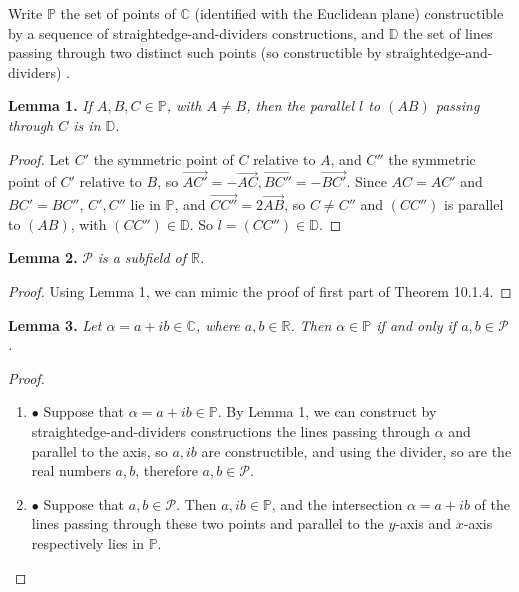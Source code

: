 \documentclass[11pt,a4paper]{article}
\newcommand{\be} {\begin{enumerate}}
\newcommand{\ee} {\end{enumerate}}
\newcommand{\R}{\mathbb{R}}
\newcommand{\C}{\mathbb{C}}
\begin{document}
Write $\mathbb{P}$ the set of points of $\C$ (identified with the Euclidean plane) constructible by a sequence of straightedge-and-dividers constructions, and $\mathbb{D}$ the set of lines passing through two distinct such points (so constructible by straightedge-and-dividers) .

\bigskip

{\bf Lemma 1. } {\it If $A,B,C\in {\mathbb P}$, with $A\ne B$, then the parallel $l$ to $(AB)$ passing through $C$ is in $\mathbb{D}$.}
\begin{proof} Let $C'$ the symmetric point of $C$ relative to $A$, and $C''$ the symmetric point of $C'$ relative to $B$, so $\overrightarrow{AC'} = -\overrightarrow{AC}, \overrightarrow{BC''} = - \overrightarrow{BC'}$. Since $AC = AC'$ and $BC' = BC''$, $C',C''$ lie in  $\mathbb{P}$, and $\overrightarrow{CC''} = 2 \overrightarrow{AB}$, so $C \ne C''$ and $(CC'')$ is parallel to $(AB)$, with $(CC'') \in \mathbb{D}$. So $l = (CC'') \in \mathbb{D}$.
\end{proof} 

{\bf Lemma 2.}  ${\mathscr P} $ {\it is a subfield of $\R$.}
\begin{proof}
Using Lemma 1, we can mimic the proof of first part of Theorem 10.1.4.
\end{proof}

{\bf Lemma 3.} {\it Let $\alpha = a+ib \in \C$, where $a,b \in \R$. Then $\alpha \in \mathbb{ P}$ if and only if $a,b \in {\mathscr P} $.}


\begin{proof}

\be

\item[$\bullet$] Suppose that $\alpha =a +i b \in \mathbb{P}$. By Lemma 1, we can construct by straightedge-and-dividers constructions the lines passing through $\alpha$ and parallel to the axis, so $a, ib$ are constructible, and using the divider, so are  the real numbers $a,b$, therefore $a,b \in {\mathscr P} $.
\item[$\bullet$] Suppose that $a,b \in {\mathscr P} $. Then $a, ib \in \mathbb{P}$, and the intersection $\alpha = a+ib$ of the lines passing through these two points and parallel to the $y$-axis and $x$-axis respectively lies in $\mathbb{P}$.
\ee

\end{proof}
\end{document}
